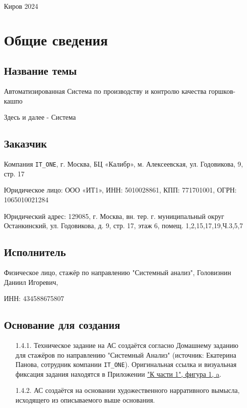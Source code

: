 \documentclass[16pt,a4paper]{article}
\begin{document}
\begin{titlepage}
    \vspace{\fill}

    \begin{center}
    Киров 2024
    \end{center}

    \end{titlepage}

\fancyhf{}
\fancyhead[C]{\thepage}


\newpage
\tableofcontents
\newpage
\section{Общие сведения}
\subsection{Название темы}
Автоматизированная Система по производству и контролю качества горшков-кашпо

Здесь и далее - Система
\subsection{Заказчик}
Компания \verb|IT_ONE|, г. Москва, БЦ «Калибр», м. Алексеевская, ул. Годовикова, 9, стр. 17

Юридическое лицо: ООО «ИТ1», ИНН: 5010028861, КПП: 771701001, ОГРН: 1065010021284

Юридический адрес: 129085, г. Москва, вн. тер. г. муниципальный округ Останкинский, ул. Годовикова, д. 9, стр. 17, этаж 6, помещ. 1,2,15,17,19,Ч.3,5,7
\subsection{Исполнитель}
Физическое лицо, стажёр по направлению "Системный анализ", Головизнин Даниил Игоревич, 

ИНН: 434588675807
\subsection{Основание для создания}
\label{sec:1.4.}
\begin{enumerate}
    \item [1.4.1.] Техническое задание на АС создаётся согласно Домашнему заданию для стажёров по направлению "Системный Анализ" (источник: Екатерина Панова, сотрудник компании \verb|IT_ONE|). Оригинальная ссылка и визуальная фиксация задания находятся в Приложении \hyperref[fig:first]{"К части 1", фигура 1, a}.
    \item [1.4.2.] АС создаётся на основании художественного нарративного вымысла, исходящего из описываемого выше основания.
\end{enumerate}
\end{document}
